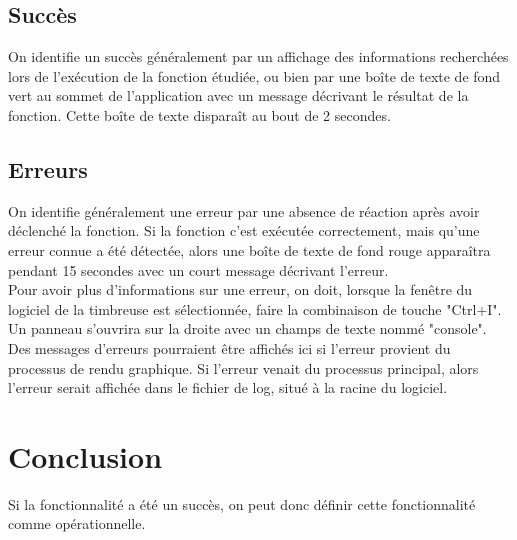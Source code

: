 \documentclass[10pt,a4paper,onecolumn]{article}
\begin{document}
\subsection{Succès}
On identifie un succès généralement par un affichage des informations recherchées lors de l'exécution de la fonction étudiée, ou bien par une boîte de texte de fond vert au sommet de l'application avec un message décrivant le résultat de la fonction. Cette boîte de texte disparaît au bout de 2 secondes.
\subsection{Erreurs}
On identifie généralement une erreur par une absence de réaction après avoir déclenché la fonction. Si la fonction c'est exécutée correctement, mais qu'une erreur connue a été détectée, alors une boîte de texte de fond rouge apparaîtra pendant 15 secondes avec un court message décrivant l'erreur.
\\
Pour avoir plus d'informations sur une erreur, on doit, lorsque la fenêtre du logiciel de la timbreuse est sélectionnée, faire la combinaison de touche "Ctrl+I". Un panneau s'ouvrira sur la droite avec un champs de texte nommé "console". Des messages d'erreurs pourraient être affichés ici si l'erreur provient du processus de rendu graphique. Si l'erreur venait du processus principal, alors l'erreur serait affichée dans le fichier de log, situé à la racine du logiciel.
\section{Conclusion}
Si la fonctionnalité a été un succès, on peut donc définir cette fonctionnalité comme opérationnelle. 
\end{document}
